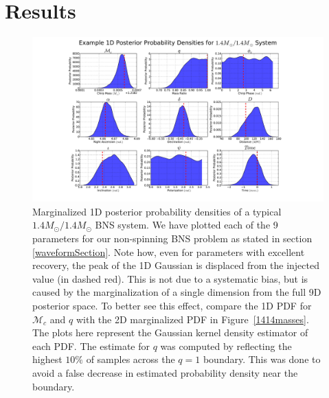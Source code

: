 \documentclass[11pt,a4paper]{emulateapj} 
\begin{document}
\section{Results}
\label{resultsSection} 

\begin{figure}[t!]
\centering \includegraphics[trim=7cm 0cm 0cm 0cm,
  clip=true,scale=0.55]{9dpdf}
\caption{\label{9dPDF} Marginalized 1D  posterior probability densities
  of a typical $1.4M_{\odot}/1.4M_{\odot}$ BNS
  system.  We have plotted each of the 9 parameters for our
  non-spinning BNS problem as stated in section \ref{waveformSection}.
    Note how, even for parameters with excellent recovery, the peak of
  the 1D Gaussian is displaced from the injected value (in dashed
  red).  This is not due to a systematic bias, but is caused by the
  marginalization of a single dimension from the full 9D posterior
  space.  To better see this effect, compare the 1D PDF for
  $\mathcal{M}_{c}$ and $q$ with the 2D marginalized PDF in
  Figure~\ref{1414masses}.  The plots here represent the Gaussian kernel density
  estimator of each PDF.  The estimate for $q$ was 
  computed by reflecting the highest $10\%$ of samples across the $q=1$ boundary.  
  This was done to avoid a false decrease in estimated probability density near
  the boundary.}
\end{figure}
\end{document}
